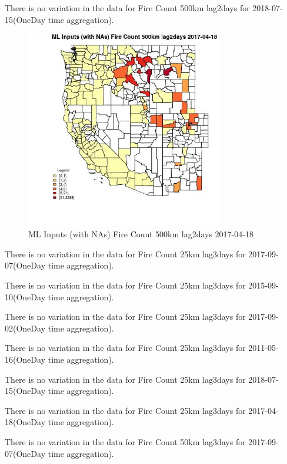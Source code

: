 There is no variation in the data for Fire Count 500km lag2days for 2018-07-15(OneDay time aggregation). 
 

\begin{figure} 
\centering  
\includegraphics[width=0.77\textwidth]{Code_Outputs/Report_ML_input_PM25_Step4_part_e_de_duplicated_aves_compiled_2019-05-21wNAs_CountyFire_Count_500km_lag2daysMean2017-04-18.jpg} 
\caption{\label{fig:Report_ML_input_PM25_Step4_part_e_de_duplicated_aves_compiled_2019-05-21wNAsCountyFire_Count_500km_lag2daysMean2017-04-18}ML Inputs (with NAs) Fire Count 500km lag2days 2017-04-18} 
\end{figure} 
 

There is no variation in the data for Fire Count 25km lag3days for 2017-09-07(OneDay time aggregation). 
 

There is no variation in the data for Fire Count 25km lag3days for 2015-09-10(OneDay time aggregation). 
 

There is no variation in the data for Fire Count 25km lag3days for 2017-09-02(OneDay time aggregation). 
 

There is no variation in the data for Fire Count 25km lag3days for 2011-05-16(OneDay time aggregation). 
 

There is no variation in the data for Fire Count 25km lag3days for 2018-07-15(OneDay time aggregation). 
 

There is no variation in the data for Fire Count 25km lag3days for 2017-04-18(OneDay time aggregation). 
 

There is no variation in the data for Fire Count 50km lag3days for 2017-09-07(OneDay time aggregation). 
 

